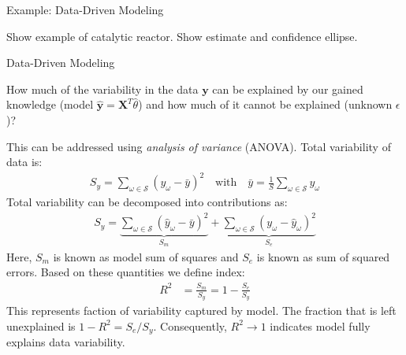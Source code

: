 \documentclass[9pt]{beamer}
\begin{document}
%
\begin{frame}{Example: Data-Driven Modeling}

\begin{block}{}
Show example of catalytic reactor. Show estimate and confidence ellipse. 
\end{block}

\end{frame}

%
\begin{frame}{Data-Driven Modeling}

\begin{block}{}
How much of the variability in the data $\mathbf{y}$ can be explained by our gained knowledge (model $\hat{\mathbf{y}}=\mathbf{X}^T\hat{\theta}$) and how much of it cannot be explained (unknown $\epsilon$)?
\end{block}
This can be addressed using {\em analysis of variance} (ANOVA).  Total variability of data is:
\begin{align*}
S_{y}=\sum_{\omega\in \mathcal{S}}(y_\omega -\bar{{y}})^2\quad \textrm{with}
\quad \bar{{y}}=\frac{1}{S}\sum_{\omega \in \mathcal{S}}y_\omega 
\end{align*}
Total variability can be decomposed into contributions as:
\begin{align*}
S_{y}=\underbrace{\sum_{\omega\in \mathcal{S}}(\hat{y}_\omega -\bar{y})^2}_{S_m}+\underbrace{\sum_{\omega\in \mathcal{S}}(y_\omega -\hat{y}_\omega)^2}_{S_e}
\end{align*}
Here, $S_m$ is known as model sum of squares and $S_e$ is known as sum of squared errors.  Based on these quantities we define index: 
\begin{align*}
R^2&=\frac{S_m}{S_y}=1-\frac{S_e}{S_y}
\end{align*}
This represents faction of variability captured by model. The fraction that is left unexplained is $1-R^2={S_e}/{S_y}$.  Consequently, $R^2\to 1$ indicates model fully explains data variability. 
\end{frame}
\end{document}
